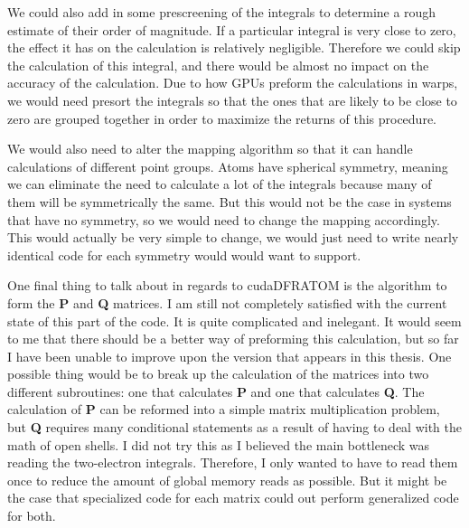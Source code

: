 We could also add in some prescreening of the integrals to determine a rough estimate of their order of magnitude. If a particular integral is very close to zero, the effect it has on the calculation is relatively negligible. Therefore we could skip the calculation of this integral, and there would be almost no impact on the accuracy of the calculation. Due to how GPUs preform the calculations in warps, we would need presort the integrals so that the ones that are likely to be close to zero are grouped together in order to maximize the returns of this procedure.

We would also need to alter the mapping algorithm so that it can handle calculations of different point groups. Atoms have spherical symmetry, meaning we can eliminate the need to calculate a lot of the integrals because many of them will be symmetrically the same. But this would not be the case in systems that have no symmetry, so we would need to change the mapping accordingly. This would actually be very simple to change, we would just need to write nearly identical code for each symmetry would would want to support.

One final thing to talk about in regards to cudaDFRATOM is the algorithm to form the \textbf{P} and \textbf{Q} matrices. I am still not completely satisfied with the current state of this part of the code. It is quite complicated and inelegant. It would seem to me that there should be a better way of preforming this calculation, but so far I have been unable to improve upon the version that appears in this thesis. One possible thing would be to break up the calculation of the matrices into two different subroutines: one that calculates \textbf{P} and one that calculates \textbf{Q}. The calculation of \textbf{P} can be reformed into a simple matrix multiplication problem, but \textbf{Q} requires many conditional statements as a result of having to deal with the math of open shells. I did not try this as I believed the main bottleneck was reading the two-electron integrals. Therefore, I only wanted to have to read them once to reduce the amount of global memory reads as possible. But it might be the case that specialized code for each matrix could out perform generalized code for both.

